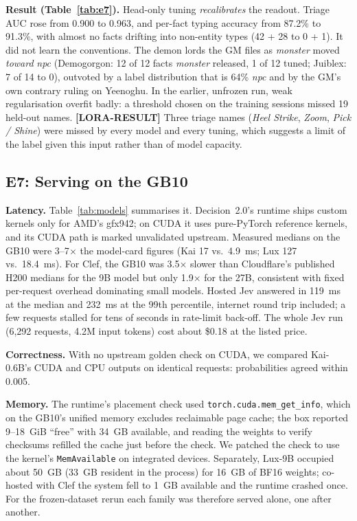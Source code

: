 \documentclass[11pt]{article}
\newcommand{\TODO}[1]{\textbf{[#1]}}
\begin{document}
\textbf{Result (Table~\ref{tab:e7}).} Head-only tuning \emph{recalibrates} the readout. Triage
AUC rose from 0.900 to 0.963, and per-fact typing accuracy from 87.2\% to 91.3\%, with almost no
facts drifting into non-entity types (42 + 28 to 0 + 1). It did not learn the conventions. The demon lords the GM files
as \emph{monster} moved \emph{toward} \emph{npc} (Demogorgon: 12 of 12 facts \emph{monster} released, 1 of 12
tuned; Juiblex: 7 of 14 to 0), outvoted by a label distribution that is 64\% \emph{npc} and by the GM's own
contrary ruling on Yeenoghu. In the earlier, unfrozen run, weak regularisation overfit badly: a threshold chosen on the training
sessions missed 19 held-out names. \TODO{LORA-RESULT} Three triage names
(\emph{Heel Strike}, \emph{Zoom}, \emph{Pick / Shine}) were missed by every model and every
tuning, which suggests a limit of the label given this input rather than of model capacity.

\subsection{E7: Serving on the GB10}
\textbf{Latency.} Table~\ref{tab:models} summarises it. Decision~2.0's runtime ships custom kernels only for
AMD's gfx942; on CUDA it uses pure-PyTorch reference kernels, and its CUDA path is marked unvalidated
upstream. Measured medians on the GB10 were 3--7$\times$ the model-card figures (Kai 17 vs.\ 4.9~ms; Lux 127 vs.\ 18.4~ms). For Clef, the GB10 was
3.5$\times$ slower than Cloudflare's published H200 medians for the 9B model but only 1.9$\times$ for the
27B, consistent with fixed per-request overhead dominating small models. Hosted Jev answered in
119~ms at the median and 232~ms at the 99th percentile, internet round trip included; a few
requests stalled for tens of seconds in rate-limit back-off. The whole Jev run (6{,}292 requests,
4.2M input tokens) cost about \$0.18 at the listed price.

\textbf{Correctness.} With no upstream golden check on CUDA, we compared Kai-0.6B's CUDA and CPU
outputs on identical requests: probabilities agreed within 0.005.

\textbf{Memory.} The runtime's placement check used \texttt{torch.cuda.mem\_get\_info}, which on the
GB10's unified memory excludes reclaimable page cache; the box reported 9--18~GiB ``free'' with 34~GB
available, and reading the weights to verify checksums refilled the cache just before the check. We
patched the check to use the kernel's \texttt{MemAvailable} on integrated devices. Separately, Lux-9B
occupied about 50~GB (33~GB resident in the process) for 16~GB of BF16 weights; co-hosted with Clef the
system fell to 1~GB available and the runtime crashed once. For the frozen-dataset rerun each family
was therefore served alone, one after another.
\end{document}
